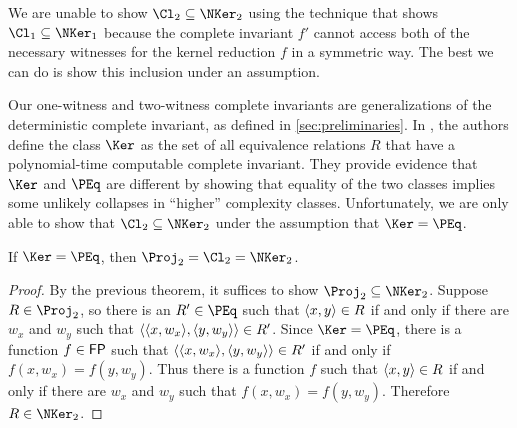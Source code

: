 We are unable to show $\Cl_2 \subseteq \NKer_2$ using the technique that shows $\Cl_1 \subseteq \NKer_1$ because the complete invariant $f'$ cannot access both of the necessary witnesses for the kernel reduction $f$ in a symmetric way.
The best we can do is show this inclusion under an assumption.

Our one-witness and two-witness complete invariants are generalizations of the deterministic complete invariant, as defined in \autoref{sec:preliminaries}.
In \autocite{fg11}, the authors define the class $\Ker$ as the set of all equivalence relations $R$ that have a polynomial-time computable complete invariant.
They provide evidence that $\Ker$ and $\PEq$ are different by showing that equality of the two classes implies some unlikely collapses in ``higher'' complexity classes.
Unfortunately, we are only able to show that $\Cl_2 \subseteq \NKer_2$ under the assumption that $\Ker = \PEq$.

\begin{corollary}
  If $\Ker = \PEq$, then $\Proj_2 = \Cl_2 = \NKer_2$.
\end{corollary}
\begin{proof}
  By the previous theorem, it suffices to show $\Proj_2 \subseteq \NKer_2$.
  Suppose $R \in \Proj_2$, so there is an $R' \in \PEq$ such that $\langle x,y\rangle \in R$ if and only if there are $w_x$ and $w_y$ such that $\langle\langle x,w_x\rangle,\langle y,w_y\rangle\rangle \in R'$.
  Since $\Ker = \PEq$, there is a function $f \in {\ensuremath{\mathsf{FP}}}$ such that $\langle\langle x,w_x\rangle,\langle y,w_y\rangle\rangle \in R'$ if and only if $f(x, w_x) = f(y, w_y)$.
  Thus there is a function $f$ such that $\langle x,y\rangle \in R$ if and only if there are $w_x$ and $w_y$ such that $f(x, w_x) = f(y, w_y)$.
  Therefore $R \in \NKer_2$.
\end{proof}

